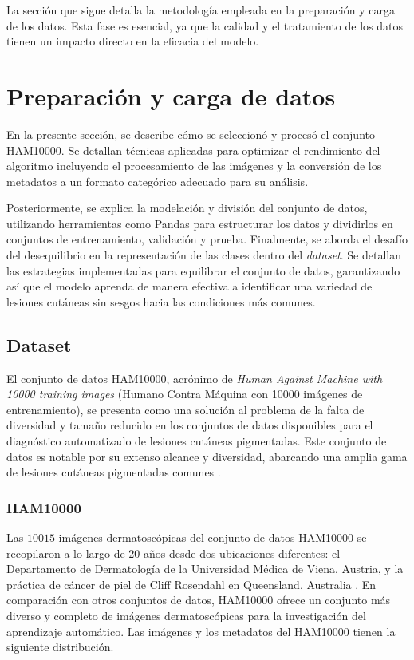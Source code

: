 La sección que sigue detalla la metodología empleada en la preparación y carga de los datos. Esta fase es esencial, ya que la calidad y el tratamiento de los datos tienen un impacto directo en la eficacia del modelo.

\section{Preparación y carga de datos}

En la presente sección, se describe cómo se seleccionó y procesó el conjunto HAM10000. Se detallan técnicas aplicadas para optimizar el rendimiento del algoritmo incluyendo el procesamiento de las imágenes y la conversión de los metadatos a un formato categórico adecuado para su análisis.

Posteriormente, se explica la modelación y división del conjunto de datos, utilizando herramientas como Pandas para estructurar los datos y dividirlos en conjuntos de entrenamiento, validación y prueba. Finalmente, se aborda el desafío del desequilibrio en la representación de las clases dentro del \textit{dataset}. Se detallan las estrategias implementadas para equilibrar el conjunto de datos, garantizando así que el modelo aprenda de manera efectiva a identificar una variedad de lesiones cutáneas sin sesgos hacia las condiciones más comunes.

\subsection{Dataset}

El conjunto de datos HAM10000, acrónimo de \textit{Human Against Machine with 10000 training images} (Humano Contra Máquina con 10000 imágenes de entrenamiento), se presenta como una solución al problema de la falta de diversidad y tamaño reducido en los conjuntos de datos disponibles para el diagnóstico automatizado de lesiones cutáneas pigmentadas. Este conjunto de datos es notable por su extenso alcance y diversidad, abarcando una amplia gama de lesiones cutáneas pigmentadas comunes . 

\subsubsection*{HAM10000}

Las $10015$ imágenes dermatoscópicas del conjunto de datos HAM10000 se recopilaron a lo largo de 20 años desde dos ubicaciones diferentes: el Departamento de Dermatología de la Universidad Médica de Viena, Austria, y la práctica de cáncer de piel de Cliff Rosendahl en Queensland, Australia . En comparación con otros conjuntos de datos, HAM10000 ofrece un conjunto más diverso y completo de imágenes dermatoscópicas para la investigación del aprendizaje automático. Las imágenes y los metadatos del HAM10000  tienen la siguiente distribución.

